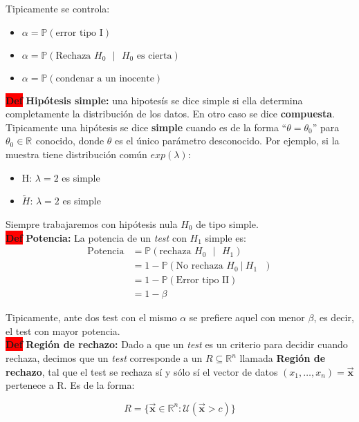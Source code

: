 \documentclass[letterpaper,10.5pt,twocolumn]{article} %
\newcommand{\R}[1][]{\mathbb{R}^{#1}}
\newcommand{\Proba}{\mathbb{P} }
\newcommand{\vect}[1]{\boldsymbol{\vec{#1}}}
\newcommand{\hlc}[2][yellow]{ \colorbox{#1}{#2} }
\newcommand{\Def}{\hlc[red]{\bfseries Def}}
\begin{document}
Tipicamente se controla:
\begin{itemize}
	\item $\alpha = \Proba (\textrm{error tipo I}) $
	\item $\alpha = \Proba (\textrm{Rechaza $H_0$ $|$ $H_0$ es cierta}) $
	\item $\alpha = \Proba (\textrm{condenar a un inocente}) $
\end{itemize}

\Def \textbf{Hipótesis simple:} una hipotesís se dice simple si ella determina completamente la distribución de los datos. En otro caso se dice \textbf{compuesta}.\\ 
Tipicamente una hipótesis se dice \textbf{simple} cuando es de la forma ``$\theta = \theta_{0}$'' para $\theta_0 \in \R $ conocido, donde $\theta$ es el único parámetro desconocido. Por ejemplo, si la muestra tiene distribución común $exp(\lambda)$:
\begin{itemize}
	\item H: $\lambda = 2 $ es simple
	\item $ \widetilde{H} $: $\lambda = 2 $ es simple
\end{itemize}

Siempre trabajaremos con hipótesis nula $H_0 $ de tipo simple.\\

\Def \textbf{Potencia:} La potencia de un \textit{test} con $H_1 $ simple es:
\begin{align*}
    \textrm{Potencia} &= \Proba (\textrm{rechaza $H_0$ $|$ $H_1$})\\
    &= 1- \Proba (\textrm{No rechaza $H_0\ |\ H_1$ })\\
    &= 1 - \Proba (\textrm{Error tipo II})\\
    &= 1 - \beta
\end{align*}

Tipicamente, ante dos test con el mismo $\alpha$ se prefiere aquel con menor $\beta$, es decir, el test con mayor potencia.\\

\Def \textbf{Región de rechazo:} Dado a que un \textit{test} es un criterio para decidir cuando rechaza, decimos que un \textit{test} corresponde a un $R \subseteq \R[n]$ llamada \textbf{Región de rechazo}, tal que el test se rechaza sí y sólo sí el vector de datos $(x_1,\ldots,x_n) = \vect{x} $ pertenece a R. Es de la forma:

\begin{equation*}
	R = \{\vect{x} \in \R[n]: \mathcal{U} (\vect{x} > c) \}
\end{equation*}
\end{document}
